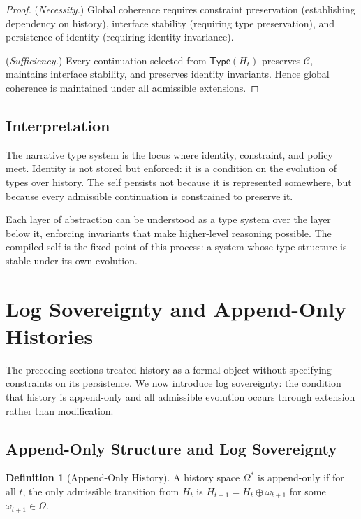 \documentclass[12pt, a4paper]{article}
\theoremstyle{plain}
\theoremstyle{definition}
\newtheorem{definition}[theorem]{Definition}
\theoremstyle{remark}
\begin{document}
\begin{proof}
(\textit{Necessity.}) Global coherence requires constraint preservation (establishing dependency on history), interface stability (requiring type preservation), and persistence of identity (requiring identity invariance).

(\textit{Sufficiency.}) Every continuation selected from $\mathsf{Type}(H_t)$ preserves $\mathcal{C}$, maintains interface stability, and preserves identity invariants. Hence global coherence is maintained under all admissible extensions.
\end{proof}

\subsection{Interpretation}

The narrative type system is the locus where identity, constraint, and policy meet. Identity is not stored but enforced: it is a condition on the evolution of types over history. The self persists not because it is represented somewhere, but because every admissible continuation is constrained to preserve it.

Each layer of abstraction can be understood as a type system over the layer below it, enforcing invariants that make higher-level reasoning possible. The compiled self is the fixed point of this process: a system whose type structure is stable under its own evolution.

\section{Log Sovereignty and Append-Only Histories}

The preceding sections treated history as a formal object without specifying constraints on its persistence. We now introduce log sovereignty: the condition that history is append-only and all admissible evolution occurs through extension rather than modification.

\subsection{Append-Only Structure and Log Sovereignty}

\begin{definition}[Append-Only History]
A history space $\Omega^*$ is append-only if for all $t$, the only admissible transition from $H_t$ is $H_{t+1} = H_t \oplus \omega_{t+1}$ for some $\omega_{t+1} \in \Omega$.
\end{definition}
\end{document}
